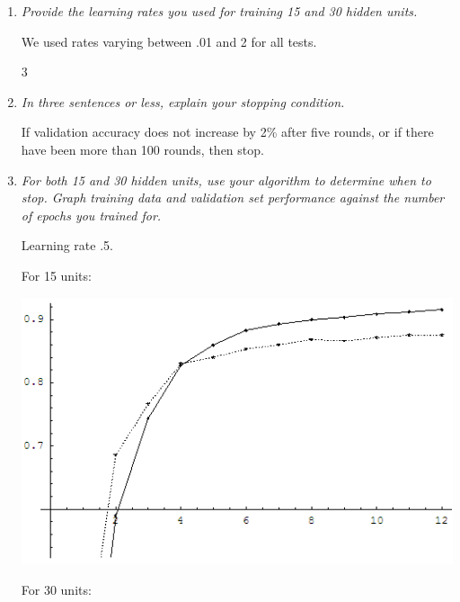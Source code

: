 \documentclass{article}
\newcommand{\edit}[1]{}
\begin{document}
\begin{enumerate}
\begin{enumerate}
    \item \textit{Provide the learning rates you used for training 15
      and 30 hidden units.}
      
      We used rates varying between .01 and 2 for all tests.


      \setcounter{enumii}3

    \item \textit{In three sentences or less, explain your stopping
      condition.}

      If validation accuracy does not increase by 2\% after five rounds,
      or if there have been more than 100 rounds, then stop. 
      
    \item \textit{For both 15 and 30 hidden units, use your algorithm
      to determine when to stop. Graph training data and validation
      set performance against the number of epochs you trained for.}

      Learning rate .5.

      For 15 units:

      \begin{center}
        \includegraphics[scale=.35]{15_early_stop.png}
      \end{center}

      For 30 units:


\end{enumerate}
\end{enumerate}
\end{document}
